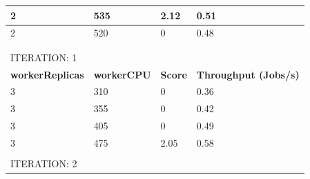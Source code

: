 \begin{table}[H]
\begin{tabular}{llll}
\multicolumn{1}{|l|}{2}                       & \multicolumn{1}{l|}{535}                & \multicolumn{1}{l|}{2.12}           & \multicolumn{1}{l|}{0.51}                        \\ \hline
\multicolumn{1}{|l|}{2}                       & \multicolumn{1}{l|}{520}                & \multicolumn{1}{l|}{0}              & \multicolumn{1}{l|}{0.48}                        \\ \hline
                                              &                                         &                                     &                                                  \\
                                              &                                         &                                     &                                                  \\
ITERATION: 1                                  &                                         &                                     &                                                  \\ \hline
\multicolumn{1}{|l|}{\textbf{workerReplicas}} & \multicolumn{1}{l|}{\textbf{workerCPU}} & \multicolumn{1}{l|}{\textbf{Score}} & \multicolumn{1}{l|}{\textbf{Throughput (Jobs/s)}} \\ \hline
\multicolumn{1}{|l|}{3}                       & \multicolumn{1}{l|}{310}                & \multicolumn{1}{l|}{0}              & \multicolumn{1}{l|}{0.36}                        \\ \hline
\multicolumn{1}{|l|}{3}                       & \multicolumn{1}{l|}{355}                & \multicolumn{1}{l|}{0}              & \multicolumn{1}{l|}{0.42}                        \\ \hline
\multicolumn{1}{|l|}{3}                       & \multicolumn{1}{l|}{405}                & \multicolumn{1}{l|}{0}              & \multicolumn{1}{l|}{0.49}                        \\ \hline
\multicolumn{1}{|l|}{3}                       & \multicolumn{1}{l|}{475}                & \multicolumn{1}{l|}{2.05}           & \multicolumn{1}{l|}{0.58}                        \\ \hline
                                              &                                         &                                     &                                                  \\
ITERATION: 2                                  &                                         &                                     &                                                  \\ \hline

\end{tabular}
\end{table}

